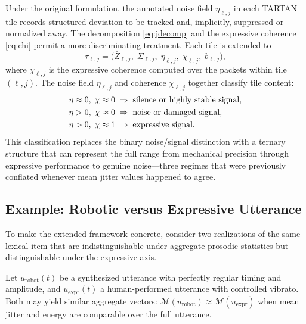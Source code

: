 \documentclass[12pt, a4paper]{article}
\begin{document}
Under the original formulation, the annotated noise field $\eta_{\ell,j}$ in each TARTAN tile records structured deviation to be tracked and, implicitly, suppressed or normalized away. The decomposition \eqref{eq:jdecomp} and the expressive coherence \eqref{eq:chi} permit a more discriminating treatment. Each tile is extended to
\begin{equation}
\tau_{\ell,j} = \bigl(\bar{Z}_{\ell,j},\; \Sigma_{\ell,j},\; \eta_{\ell,j},\; \chi_{\ell,j},\; b_{\ell,j}\bigr),
\label{eq:tileext}
\end{equation}
where $\chi_{\ell,j}$ is the expressive coherence computed over the packets within tile $(\ell, j)$. The noise field $\eta_{\ell,j}$ and coherence $\chi_{\ell,j}$ together classify tile content:
\begin{align}
\eta \approx 0,\; \chi \approx 0 &\;\Rightarrow\; \text{silence or highly stable signal,} \notag\\
\eta > 0,\; \chi \approx 0 &\;\Rightarrow\; \text{noise or damaged signal,} \label{eq:classification}\\
\eta > 0,\; \chi \approx 1 &\;\Rightarrow\; \text{expressive signal.} \notag
\end{align}
This classification replaces the binary noise/signal distinction with a ternary structure that can represent the full range from mechanical precision through expressive performance to genuine noise---three regimes that were previously conflated whenever mean jitter values happened to agree.

\subsection{Example: Robotic versus Expressive Utterance}

To make the extended framework concrete, consider two realizations of the same lexical item that are indistinguishable under aggregate prosodic statistics but distinguishable under the expressive axis.

Let $u_{\mathrm{robot}}(t)$ be a synthesized utterance with perfectly regular timing and amplitude, and $u_{\mathrm{expr}}(t)$ a human-performed utterance with controlled vibrato. Both may yield similar aggregate vectors: $\mathcal{M}(u_{\mathrm{robot}}) \approx \mathcal{M}(u_{\mathrm{expr}})$ when mean jitter and energy are comparable over the full utterance.
\end{document}
